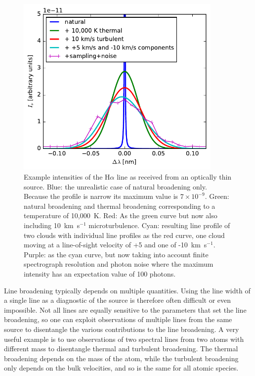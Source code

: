 \documentclass[12pt]{article}
\numberwithin{equation}{section}
\begin{document}
   \begin{figure}
   \centering
   \includegraphics[width=10cm]{figs/line_broadening.pdf}
    \caption{Example intensities of the H$\alpha$ line as received from an optically thin source. Blue: the unrealistic case of natural broadening only. Because the profile is narrow its maximum value is $7\times10^{-9}$. Green: natural broadening and thermal broadening corresponding to  a temperature of 10,000~K. Red: As the green curve but now also including 10~km~s$^{-1}$ microturbulence. Cyan: resulting line profile of two clouds with individual line profiles as the red curve, one cloud moving at a line-of-sight velocity of +5 and one of -10~km~s$^{-1}$. Purple: as the cyan curve, but now taking into account finite spectrograph resolution and photon noise where the maximum intensity has an expectation value of 100 photons.}
    \label{fig:line_broadening}
    \end{figure}

Line broadening typically depends on multiple quantities. Using the line width of a single line as a diagnostic of the source is therefore often difficult or even impossible. Not all lines are equally sensitive to the parameters that set the line broadening, so one can exploit observations of multiple lines from the same source to disentangle the various contributions to the line broadening. A very useful example is to use observations of two spectral lines from two atoms with different mass to disentangle thermal and turbulent broadening. The thermal broadening depends on the mass of the atom, while the turbulent broadening only depends on the bulk velocities, and so is the same for all atomic species.
\end{document}
